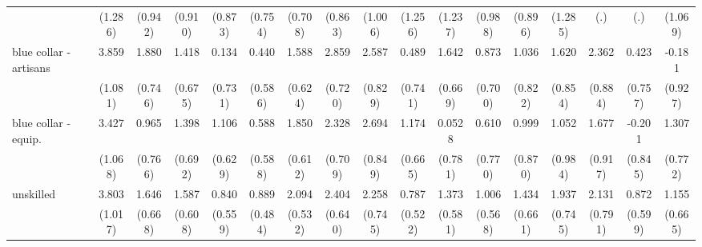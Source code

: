 {\begin{tabular}{l*{16}{c}}
                    &     (1.286)         &     (0.942)         &     (0.910)         &     (0.873)         &     (0.754)         &     (0.708)         &     (0.863)         &     (1.006)         &     (1.256)         &     (1.237)         &     (0.988)         &     (0.896)         &     (1.285)         &         (.)         &         (.)         &     (1.069)         \\
[1em]
blue collar - artisans&       3.859\sym{***}&       1.880\sym{*}  &       1.418\sym{*}  &       0.134         &       0.440         &       1.588\sym{*}  &       2.859\sym{***}&       2.587\sym{**} &       0.489         &       1.642\sym{*}  &       0.873         &       1.036         &       1.620         &       2.362\sym{**} &       0.423         &      -0.181         \\
                    &     (1.081)         &     (0.746)         &     (0.675)         &     (0.731)         &     (0.586)         &     (0.624)         &     (0.720)         &     (0.829)         &     (0.741)         &     (0.669)         &     (0.700)         &     (0.822)         &     (0.854)         &     (0.884)         &     (0.757)         &     (0.927)         \\
[1em]
blue collar - equip.&       3.427\sym{**} &       0.965         &       1.398\sym{*}  &       1.106         &       0.588         &       1.850\sym{**} &       2.328\sym{**} &       2.694\sym{**} &       1.174         &      0.0528         &       0.610         &       0.999         &       1.052         &       1.677         &      -0.201         &       1.307         \\
                    &     (1.068)         &     (0.766)         &     (0.692)         &     (0.629)         &     (0.588)         &     (0.612)         &     (0.709)         &     (0.849)         &     (0.665)         &     (0.781)         &     (0.770)         &     (0.870)         &     (0.984)         &     (0.917)         &     (0.845)         &     (0.772)         \\
[1em]
unskilled           &       3.803\sym{***}&       1.646\sym{*}  &       1.587\sym{**} &       0.840         &       0.889         &       2.094\sym{***}&       2.404\sym{***}&       2.258\sym{**} &       0.787         &       1.373\sym{*}  &       1.006         &       1.434\sym{*}  &       1.937\sym{**} &       2.131\sym{**} &       0.872         &       1.155         \\
                    &     (1.017)         &     (0.668)         &     (0.608)         &     (0.559)         &     (0.484)         &     (0.532)         &     (0.640)         &     (0.745)         &     (0.522)         &     (0.581)         &     (0.568)         &     (0.661)         &     (0.745)         &     (0.791)         &     (0.599)         &     (0.665)         \\

\end{tabular}}
